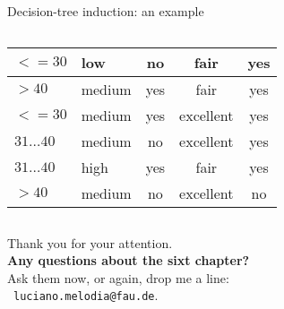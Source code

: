 \documentclass[aspectratio=169,t,table]{beamer}
\begin{document}
{\begin{frame}{Decision-tree induction: an example}
\begin{columns}
\begin{column}{0.6\textwidth}
\begin{tabular}{|l|l|c|c|c|}
            \cellcolor{yellow!20}$<=30$ & \cellcolor{yellow!20}low & \cellcolor{yellow!20}no & \cellcolor{yellow!20}fair & \cellcolor{green!20}yes \\\hline
            \cellcolor{yellow!20}$>40$ & \cellcolor{yellow!20}medium & \cellcolor{yellow!20}yes & \cellcolor{yellow!20}fair & \cellcolor{green!20}yes \\\hline
            \cellcolor{yellow!20}$<=30$ & \cellcolor{yellow!20}medium & \cellcolor{yellow!20}yes & \cellcolor{yellow!20}excellent & \cellcolor{green!20}yes \\\hline
            \cellcolor{yellow!20}$31\ldots40$ & \cellcolor{yellow!20}medium & \cellcolor{yellow!20}no & \cellcolor{yellow!20}excellent & \cellcolor{green!20}yes \\\hline
            \cellcolor{yellow!20}$31\ldots40$ & \cellcolor{yellow!20}high & \cellcolor{yellow!20}yes & \cellcolor{yellow!20}fair & \cellcolor{green!20}yes \\\hline
            \cellcolor{yellow!20}$>40$ & \cellcolor{yellow!20}medium & \cellcolor{yellow!20}no & \cellcolor{yellow!20}excellent & \cellcolor{red!20}no \\\hline
          \end{tabular}
        \end{column}
      \end{columns}
    \end{frame}
  }

  { %
    \begin{frame}[c]
      \begin{center}
        Thank you for your attention.\\
        {\bf Any questions about the sixt chapter?}\\[0.5cm]
        Ask them now, or again, drop me a line: \\
        \faSendO \ \texttt{luciano.melodia@fau.de}.
      \end{center}
    \end{frame}
  }
\end{document}

